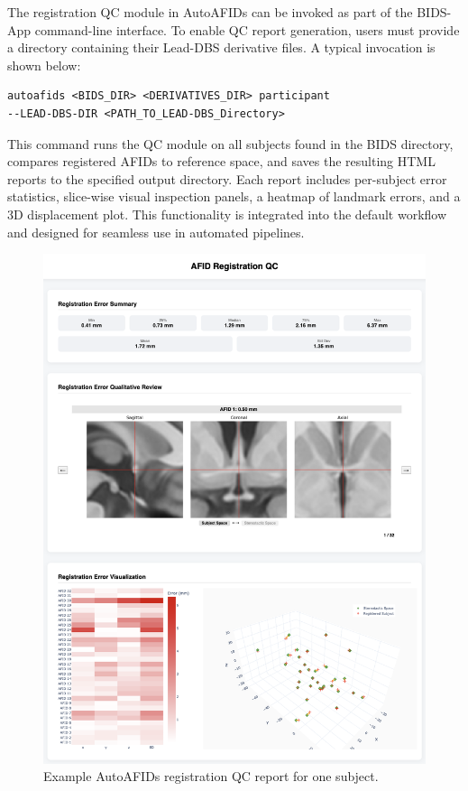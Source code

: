 The registration QC module in AutoAFIDs can be invoked as part of the BIDS-App command-line interface. To enable QC report generation, users must provide a directory containing their Lead-DBS derivative files. A typical invocation is shown below:

\begin{verbatim}
autoafids <BIDS_DIR> <DERIVATIVES_DIR> participant
--LEAD-DBS-DIR <PATH_TO_LEAD-DBS_Directory>
\end{verbatim}

This command runs the QC module on all subjects found in the BIDS directory, compares registered AFIDs to reference space, and saves the resulting HTML reports to the specified output directory. Each report includes per-subject error statistics, slice-wise visual inspection panels, a heatmap of landmark errors, and a 3D displacement plot. This functionality is integrated into the default workflow and designed for seamless use in automated pipelines.
\begin{figure}
    \centering
    \includegraphics[width=0.95\linewidth]{figs/figuresupregqc.png}
    \caption{Example AutoAFIDs registration QC report for one subject.}
    \label{fig:figuresupregqc}
\end{figure}